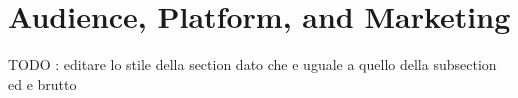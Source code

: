 \section{Audience, Platform, and Marketing}

TODO : editare lo stile della section dato che e uguale a quello della subsection ed e brutto







\pagebreak 